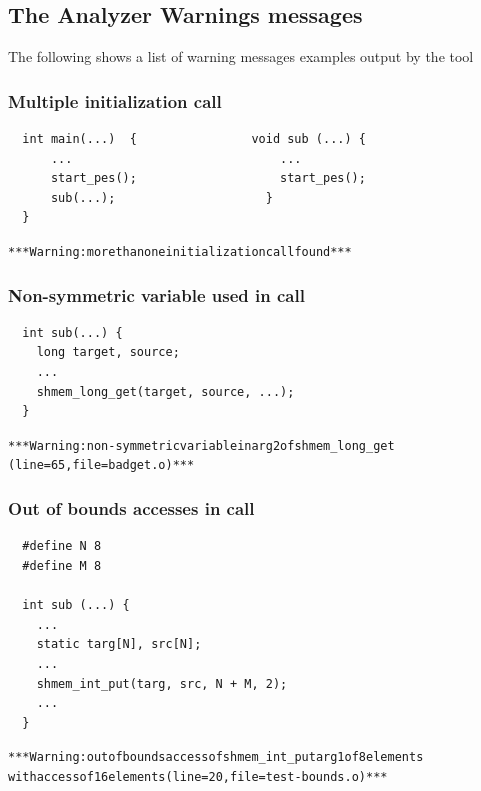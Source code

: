 \subsection{The \openshmem Analyzer Warnings messages}

The following shows a list of warning messages examples output by the tool

\subsubsection{Multiple \openshmem initialization call}

\begin{lstlisting}
  int main(...)  {                void sub (...) {
      ...                             ...
      start_pes();                    start_pes();       
      sub(...);                     } 
  }
\end{lstlisting}
\begin{alltt}
  *** \openshmem Warning: more than one \openshmem initialization call found ***
\end{alltt}

\subsubsection{Non-symmetric variable used in \openshmem call}

\begin{lstlisting}
  int sub(...) {
    long target, source;
    ...
    shmem_long_get(target, source, ...);
  }
\end{lstlisting}
\begin{alltt}
  *** \openshmem Warning: non-symmetric variable in arg2 of shmem_long_get 
  (line=65, file=badget.o) ***
\end{alltt}

\subsubsection{Out of bounds accesses in \openshmem call}

\begin{lstlisting}
  #define N 8
  #define M 8

  int sub (...) {
    ...
    static targ[N], src[N];
    ...
    shmem_int_put(targ, src, N + M, 2);
    ...
  }
\end{lstlisting}
\begin{alltt}
  *** \openshmem Warning: out of bounds access of shmem_int_put arg1 of 8 elements 
  with access of 16 elements (line=20, file=test-bounds.o) ***
\end{alltt}

